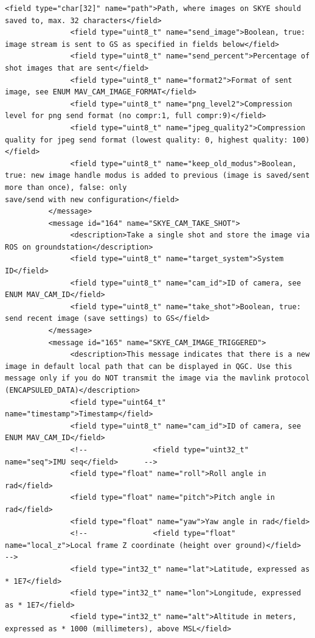 \begin{lstlisting}[captionpos=b, caption="Definition of \textsc{Skye} specific Mavlink messages", label=app_xml]
               <field type="char[32]" name="path">Path, where images on SKYE should saved to, max. 32 characters</field>
               <field type="uint8_t" name="send_image">Boolean, true: image stream is sent to GS as specified in fields below</field>
               <field type="uint8_t" name="send_percent">Percentage of shot images that are sent</field>
               <field type="uint8_t" name="format2">Format of sent image, see ENUM MAV_CAM_IMAGE_FORMAT</field>
               <field type="uint8_t" name="png_level2">Compression level for png send format (no compr:1, full compr:9)</field>
               <field type="uint8_t" name="jpeg_quality2">Compression quality for jpeg send format (lowest quality: 0, highest quality: 100)</field>
               <field type="uint8_t" name="keep_old_modus">Boolean, true: new image handle modus is added to previous (image is saved/sent more than once), false: only 
save/send with new configuration</field>
          </message>
          <message id="164" name="SKYE_CAM_TAKE_SHOT">
               <description>Take a single shot and store the image via ROS on groundstation</description>
               <field type="uint8_t" name="target_system">System ID</field>
               <field type="uint8_t" name="cam_id">ID of camera, see ENUM MAV_CAM_ID</field>
               <field type="uint8_t" name="take_shot">Boolean, true: send recent image (save settings) to GS</field>
          </message>
          <message id="165" name="SKYE_CAM_IMAGE_TRIGGERED">
               <description>This message indicates that there is a new image in default local path that can be displayed in QGC. Use this message only if you do NOT transmit the image via the mavlink protocol (ENCAPSULED_DATA)</description>
               <field type="uint64_t" name="timestamp">Timestamp</field>
               <field type="uint8_t" name="cam_id">ID of camera, see ENUM MAV_CAM_ID</field>
               <!--               <field type="uint32_t" name="seq">IMU seq</field>      -->
               <field type="float" name="roll">Roll angle in rad</field>
               <field type="float" name="pitch">Pitch angle in rad</field>
               <field type="float" name="yaw">Yaw angle in rad</field>
               <!--               <field type="float" name="local_z">Local frame Z coordinate (height over ground)</field>   -->
               <field type="int32_t" name="lat">Latitude, expressed as * 1E7</field>
               <field type="int32_t" name="lon">Longitude, expressed as * 1E7</field>
               <field type="int32_t" name="alt">Altitude in meters, expressed as * 1000 (millimeters), above MSL</field>

\end{lstlisting}
